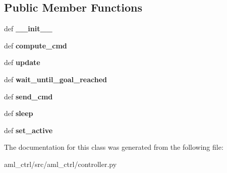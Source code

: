 \subsection*{Public Member Functions}
\begin{DoxyCompactItemize}
\item 
\hypertarget{classaml__ctrl_1_1controller_1_1_controller_ac1a1888ac43afe5d53e3120d3370db9e}{def {\bfseries \-\_\-\-\_\-init\-\_\-\-\_\-}}\label{classaml__ctrl_1_1controller_1_1_controller_ac1a1888ac43afe5d53e3120d3370db9e}

\item 
\hypertarget{classaml__ctrl_1_1controller_1_1_controller_aace14d69a66dfa391a7d1c8d137b4fe2}{def {\bfseries compute\-\_\-cmd}}\label{classaml__ctrl_1_1controller_1_1_controller_aace14d69a66dfa391a7d1c8d137b4fe2}

\item 
\hypertarget{classaml__ctrl_1_1controller_1_1_controller_ad6f4761cc5211316e70a424472748a2a}{def {\bfseries update}}\label{classaml__ctrl_1_1controller_1_1_controller_ad6f4761cc5211316e70a424472748a2a}

\item 
\hypertarget{classaml__ctrl_1_1controller_1_1_controller_a06f4b5748924ca72a3a6f349370122cd}{def {\bfseries wait\-\_\-until\-\_\-goal\-\_\-reached}}\label{classaml__ctrl_1_1controller_1_1_controller_a06f4b5748924ca72a3a6f349370122cd}

\item 
\hypertarget{classaml__ctrl_1_1controller_1_1_controller_a341e4994f8a876aef85601d622afc968}{def {\bfseries send\-\_\-cmd}}\label{classaml__ctrl_1_1controller_1_1_controller_a341e4994f8a876aef85601d622afc968}

\item 
\hypertarget{classaml__ctrl_1_1controller_1_1_controller_a4047e0ef3a57caf51b599f6d0dc78fe1}{def {\bfseries sleep}}\label{classaml__ctrl_1_1controller_1_1_controller_a4047e0ef3a57caf51b599f6d0dc78fe1}

\item 
\hypertarget{classaml__ctrl_1_1controller_1_1_controller_ab3cf24f3dae223949e893bc61595c89e}{def {\bfseries set\-\_\-active}}\label{classaml__ctrl_1_1controller_1_1_controller_ab3cf24f3dae223949e893bc61595c89e}

\end{DoxyCompactItemize}


The documentation for this class was generated from the following file\-:\begin{DoxyCompactItemize}
\item 
aml\-\_\-ctrl/src/aml\-\_\-ctrl/controller.\-py\end{DoxyCompactItemize}

